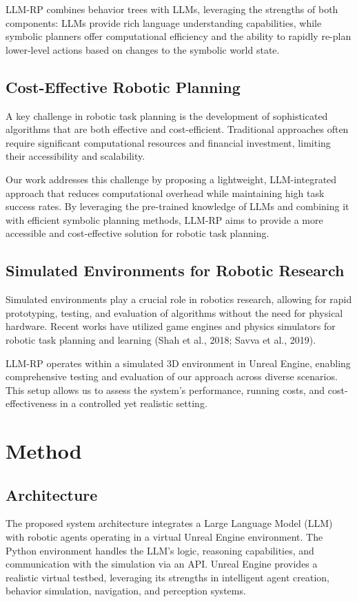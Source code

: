 \documentclass[pdflatex,sn-mathphys-num]{sn-jnl}%
\theoremstyle{thmstyleone}%
\theoremstyle{thmstyletwo}%
\theoremstyle{thmstylethree}%
\begin{document}
LLM-RP combines behavior trees with LLMs, leveraging the strengths of both components: LLMs provide rich language understanding capabilities, while symbolic planners offer computational efficiency and the ability to rapidly re-plan lower-level actions based on changes to the symbolic world state.

\subsection{Cost-Effective Robotic Planning}

A key challenge in robotic task planning is the development of sophisticated algorithms that are both effective and cost-efficient. Traditional approaches often require significant computational resources and financial investment, limiting their accessibility and scalability.

Our work addresses this challenge by proposing a lightweight, LLM-integrated approach that reduces computational overhead while maintaining high task success rates. By leveraging the pre-trained knowledge of LLMs and combining it with efficient symbolic planning methods, LLM-RP aims to provide a more accessible and cost-effective solution for robotic task planning.

\subsection{Simulated Environments for Robotic Research}

Simulated environments play a crucial role in robotics research, allowing for rapid prototyping, testing, and evaluation of algorithms without the need for physical hardware. Recent works have utilized game engines and physics simulators for robotic task planning and learning (Shah et al., 2018; Savva et al., 2019).

LLM-RP operates within a simulated 3D environment in Unreal Engine, enabling comprehensive testing and evaluation of our approach across diverse scenarios. This setup allows us to assess the system's performance, running costs, and cost-effectiveness in a controlled yet realistic setting.



\section{Method}
\subsection{Architecture}
The proposed system architecture integrates a Large Language Model (LLM) with robotic agents operating in a virtual Unreal Engine environment. The Python environment handles the LLM's logic, reasoning capabilities, and communication with the simulation via an API. Unreal Engine provides a realistic virtual testbed, leveraging its strengths in intelligent agent creation, behavior simulation, navigation, and perception systems.
\end{document}
